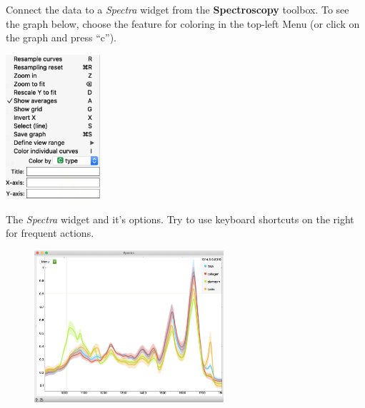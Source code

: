 Connect the data to a \textit{Spectra} widget from the \textbf{Spectroscopy} toolbox. To see the graph below, choose the feature for coloring in the top-left Menu (or click on the graph and press “c”).

\begin{marginfigure}
  \centering
  \includegraphics[width=35mm]{spectral-data-fig4.png}
  \caption{The \textit{Spectra} widget and it's options. Try to use keyboard shortcuts on the right for frequent actions.}
  \label{fig:spectral-data-fig4}
\end{marginfigure}

\begin{figure}[h]
  \centering
  \includegraphics[width=70mm]{spectral-data-fig3.png}%
  \caption{$\;$}  %
  \label{fig:spectral-data-fig3}
\end{figure}
